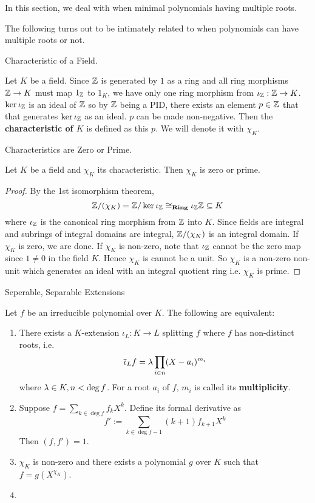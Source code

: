 \documentclass[../book.tex]{subfiles}
\begin{document}
In this section, we deal with when minimal polynomials having multiple roots.

\begin{rmk}
    The following turns out to be intimately related to when
    polynomials can have multiple roots or not.
\end{rmk}

\begin{dfn} Characteristic of a Field.
    
    Let $K$ be a field. 
    Since $\mathbb{Z}$ is generated by $1$ as a ring
    and all ring morphisms $\mathbb{Z} \to K$ must map $1_{\mathbb{Z}}$ to $1_K$,
    we have only one ring morphism from $\iota_{\mathbb{Z}} : \mathbb{Z} \to K$. 
    $\ker \iota_{\mathbb{Z}}$ is an ideal of $\mathbb{Z}$ so by $\mathbb{Z}$ being a PID,
    there exists an element $p \in \mathbb{Z}$
    that that generates $\ker \iota_{\mathbb{Z}}$ as an ideal.
    $p$ can be made non-negative. 
    Then the \textbf{characteristic of $K$} is defined as this $p$. 
    We will denote it with $\chi_K$. 
\end{dfn}
\begin{clm} Characteristics are Zero or Prime.
    
    Let $K$ be a field and $\chi_K$ its characteristic.
    Then $\chi_K$ is zero or prime. 
\end{clm}
\begin{proof}
    By the 1st isomorphism theorem, 
    \[ \mathbb{Z}/ (\chi_K) = \mathbb{Z} / \ker \iota_{\mathbb{Z}} \cong_{\mathbf{Ring}} \iota_{\mathbb{Z}} \mathbb{Z} \subseteq K\]
    where $\iota_{\mathbb{Z}}$ is the canonical ring morphism from $\mathbb{Z}$ into $K$.
    Since fields are integral and subrings of integral domains are integral,
    $\mathbb{Z} / (\chi_K)$ is an integral domain.
    If $\chi_K$ is zero, we are done.
    If $\chi_K$ is non-zero, note that $\iota_{\mathbb{Z}}$ cannot be the zero map
    since $1 \neq 0$ in the field $K$. 
    Hence $\chi_K$ is cannot be a unit. 
    So $\chi_K$ is a non-zero non-unit 
    which generates an ideal with an integral quotient ring
    i.e. $\chi_K$ is prime.
\end{proof}
\begin{dfn} Seperable, Separable Extensions
    
    Let $f$ be an irreducible polynomial over $K$. 
    The following are equivalent: 
    \begin{enumerate}
        \item There exists a $K$-extension $\iota_L : K \to L$ splitting $f$ where
        $f$ has non-distinct roots, i.e.
        \[
            \overline{\iota}_L f = \lambda \prod_{i\in n} (X - a_i)^{m_i}
        \]
        where $\lambda \in K, n < \deg f$. 
        For a root $a_i$ of $f$, $m_i$ is called its \textbf{multiplicity}.
        \item Suppose $f = \sum_{k \in \deg f} f_k X^k$.
        Define its formal derivative as 
        \[ f' := \sum_{k \in \deg f - 1} (k+1)f_{k+1}X^k \]
        Then $(f,f') = 1$.
        \item $\chi_K$ is non-zero and there exists a polynomial $g$ over $K$
        such that $f = g(X^{\chi_K})$.
        \item 
    \end{enumerate}
\end{dfn}
\end{document}
